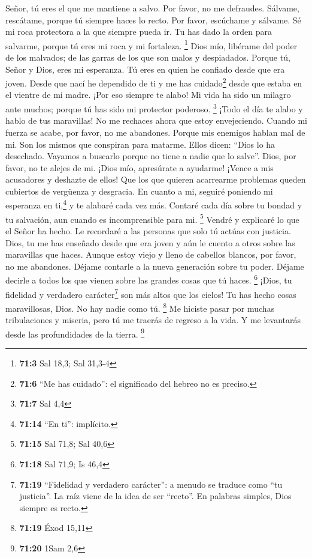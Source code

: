  Señor, tú eres el que me mantiene a salvo. Por favor, no
me defraudes.  Sálvame, rescátame, porque tú siempre haces
lo recto.  Por favor, escúchame y sálvame. Sé mi roca
protectora a la que siempre pueda ir. Tu has dado la orden para
salvarme, porque tú eres mi roca y mi fortaleza. \footnote{\textbf{71:3}
  Sal 18,3; Sal 31,3-4}  Dios mío, libérame del poder de
los malvados; de las garras de los que son malos y despiadados.
 Porque tú, Señor y Dios, eres mi esperanza. Tú eres en
quien he confiado desde que era joven.  Desde que nací he
dependido de ti y me has cuidado\footnote{\textbf{71:6} ``Me has
  cuidado'': el significado del hebreo no es preciso.} desde que estaba
en el vientre de mi madre. ¡Por eso siempre te alabo!  Mi
vida ha sido un milagro ante muchos; porque tú has sido mi protector
poderoso. \footnote{\textbf{71:7} Sal 4,4}  ¡Todo el día
te alabo y hablo de tus maravillas!  No me rechaces ahora
que estoy envejeciendo. Cuando mi fuerza se acabe, por favor, no me
abandones.  Porque mis enemigos hablan mal de mi. Son los
mismos que conspiran para matarme.  Ellos dicen: ``Dios
lo ha desechado. Vayamos a buscarlo porque no tiene a nadie que lo
salve''.  Dios, por favor, no te alejes de mi. ¡Dios mío,
apresúrate a ayudarme!  ¡Vence a mis acusadores y
deshazte de ellos! Que los que quieren acarrearme problemas queden
cubiertos de vergüenza y desgracia.  En cuanto a mi,
seguiré poniendo mi esperanza en ti,\footnote{\textbf{71:14} ``En ti'':
  implícito.} y te alabaré cada vez más.  Contaré cada
día sobre tu bondad y tu salvación, aun cuando es incomprensible para
mi. \footnote{\textbf{71:15} Sal 71,8; Sal 40,6}  Vendré
y explicaré lo que el Señor ha hecho. Le recordaré a las personas que
solo tú actúas con justicia.  Dios, tu me has enseñado
desde que era joven y aún le cuento a otros sobre las maravillas que
haces.  Aunque estoy viejo y lleno de cabellos blancos,
por favor, no me abandones. Déjame contarle a la nueva generación sobre
tu poder. Déjame decirle a todos los que vienen sobre las grandes cosas
que tú haces. \footnote{\textbf{71:18} Sal 71,9; Is 46,4}
 ¡Dios, tu fidelidad y verdadero carácter\footnote{\textbf{71:19}
  ``Fidelidad y verdadero carácter'': a menudo se traduce como ``tu
  justicia''. La raíz viene de la idea de ser ``recto''. En palabras
  simples, Dios siempre es recto.} son más altos que los cielos! Tu has
hecho cosas maravillosas, Dios. No hay nadie como tú. \footnote{\textbf{71:19}
  Éxod 15,11}  Me hiciste pasar por muchas tribulaciones
y miseria, pero tú me traerás de regreso a la vida. Y me levantarás
desde las profundidades de la tierra. \footnote{\textbf{71:20} 1Sam 2,6}

